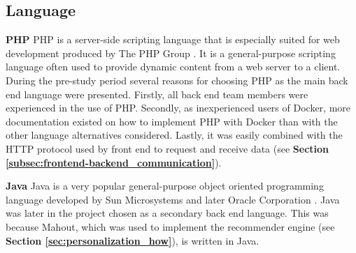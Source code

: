 \subsection{Language}
\label{subsec:backend_language}
\textbf{PHP}\newline
PHP is a server-side scripting language that is especially suited for web development produced by The PHP Group \cite{HM8}. It is a general-purpose scripting language often used to provide dynamic content from a web server to a client. During the pre-study period several reasons for choosing PHP as the main back end language were presented. Firstly, all back end team members were experienced in the use of PHP. Secondly, as inexperienced users of Docker, more documentation existed on how to implement PHP with Docker than with the other language alternatives considered.  Lastly, it was easily combined with the HTTP protocol used by front end to request and receive data (see \textbf{Section \ref{subsec:frontend-backend_communication}}).\newline

\noindent\textbf{Java}\newline
Java is a very popular general-purpose object oriented programming language developed by Sun Microsystems and later Oracle Corporation \cite{HM9}. Java was later in the project chosen as a secondary back end language. This was because Mahout, which was used to implement the recommender engine (see \textbf{Section \ref{sec:personalization_how}}), is written in Java. 

\cleardoublepage